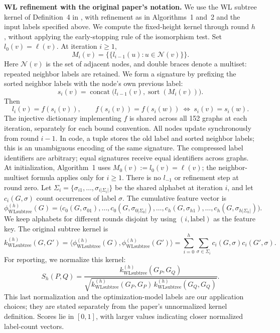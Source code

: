 \documentclass[11pt]{article}
\newcommand{\WL}{\mathrm{WLsubtree}}
\begin{document}
\begin{enumerate}[label=(AssoE.\arabic*),leftmargin=*]
\medskip
\textbf{WL refinement with the original paper's notation.}
We use the WL subtree kernel of Definition~4 in
\citet{Shervashidze2011}, with refinement as in Algorithms~1 and~2
and the input labels specified above. We compute the fixed-height
kernel through round $h$, without applying the early-stopping rule
of the isomorphism test.
Set $l_0(v)=\ell(v)$. At iteration $i\geq1$,
\[
 M_i(v)=\{\!\{l_{i-1}(u):u\in\mathcal N(v)\}\!\}.
\]
Here $\mathcal N(v)$ is the set of adjacent nodes, and double braces
denote a multiset: repeated neighbor labels are retained.
We form a signature by prefixing the sorted neighbor labels with the
node's own previous label:
\[
s_i(v)=\operatorname{concat}
\big(l_{i-1}(v),\operatorname{sort}(M_i(v))\big).
\]
Then
\[
 l_i(v)=f(s_i(v)),\qquad
 f(s_i(v))=f(s_i(w))\ \Longleftrightarrow\ s_i(v)=s_i(w).
\]
The injective dictionary implementing $f$ is shared across all 152 graphs
at each iteration, separately for each bound convention.
All nodes update synchronously from round $i-1$.
In code, a tuple stores the old label and sorted neighbor
labels; this is an unambiguous encoding of the same signature.
The compressed label identifiers are arbitrary; equal signatures receive
equal identifiers across graphs. At initialization, Algorithm~1 uses
$M_0(v):=l_0(v)=\ell(v)$; the neighbor-multiset formula applies only for
$i\geq1$. There is no $l_{-1}$ or refinement step at round zero.
Let $\Sigma_i=\{\sigma_{i1},\ldots,\sigma_{i|\Sigma_i|}\}$ be the shared
alphabet at iteration $i$, and let $c_i(G,\sigma)$ count occurrences of
label $\sigma$. The cumulative feature vector is
\[
\phi^{(h)}_{\WL}(G)=
\big(c_0(G,\sigma_{01}),\ldots,c_0(G,\sigma_{0|\Sigma_0|}),
\ldots,c_h(G,\sigma_{h1}),\ldots,c_h(G,\sigma_{h|\Sigma_h|})\big).
\]
We keep alphabets for different rounds disjoint by using
$(i,\text{label})$ as the feature key. The original subtree kernel is
\[
 k^{(h)}_{\WL}(G,G')=
 \langle\phi^{(h)}_{\WL}(G),\phi^{(h)}_{\WL}(G')\rangle
 =\sum_{i=0}^{h}\sum_{\sigma\in\Sigma_i}
 c_i(G,\sigma)c_i(G',\sigma).
\]
For reporting, we normalize this kernel:
\[
 S_h(P,Q)=
 \frac{k^{(h)}_{\WL}(G_P,G_Q)}
 {\sqrt{k^{(h)}_{\WL}(G_P,G_P)\,k^{(h)}_{\WL}(G_Q,G_Q)}}.
\]
This last normalization and the optimization-model labels are our
application choices; they are stated separately from the paper's
unnormalized kernel definition. Scores lie in $[0,1]$, with larger
values indicating closer normalized label-count vectors.


\end{enumerate}
\end{document}
